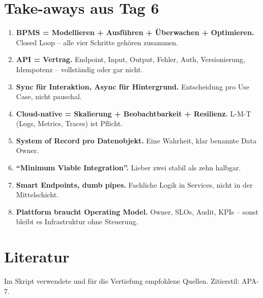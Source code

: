 \documentclass[11pt,a4paper,oneside]{article}
\begin{document}
\section{Take-aways aus Tag 6}

\begin{enumerate}
  \item \textbf{BPMS = Modellieren + Ausführen + Überwachen + Optimieren.} Closed Loop -- alle vier Schritte gehören zusammen.
  \item \textbf{API = Vertrag.} Endpoint, Input, Output, Fehler, Auth, Versionierung, Idempotenz -- vollständig oder gar nicht.
  \item \textbf{Sync für Interaktion, Async für Hintergrund.} Entscheidung pro Use Case, nicht pauschal.
  \item \textbf{Cloud-native = Skalierung + Beobachtbarkeit + Resilienz.} L-M-T (Logs, Metrics, Traces) ist Pflicht.
  \item \textbf{System of Record pro Datenobjekt.} Eine Wahrheit, klar benannte Data Owner.
  \item \textbf{``Minimum Viable Integration''.} Lieber zwei stabil als zehn halbgar.
  \item \textbf{Smart Endpoints, dumb pipes.} Fachliche Logik in Services, nicht in der Mittelschicht.
  \item \textbf{Plattform braucht Operating Model.} Owner, SLOs, Audit, KPIs -- sonst bleibt es Infrastruktur ohne Steuerung.
\end{enumerate}

\clearpage
\section{Literatur}

Im Skript verwendete und für die Vertiefung empfohlene Quellen. Zitierstil: APA-7.
\end{document}
